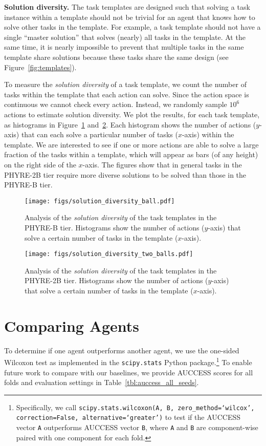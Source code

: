 \documentclass{article}
\begin{document}
\noindent\textbf{Solution diversity.} The task templates are designed such that solving a task instance within a template should not be trivial for an agent that knows how to solve other tasks in the template. For example, a task template should not have a single ``master solution'' that solves (nearly) all tasks in the template. At the same time, it is nearly impossible to prevent that multiple tasks in the same template share solutions because these tasks share the same design (see Figure~\ref{fig:templates}).

To measure the \emph{solution diversity} of a task template, we count the number of tasks within the template that each action can solve. Since the action space is continuous we cannot check every action. Instead, we randomly sample $10^6$ actions to estimate solution diversity. We plot the results, for each task template, as histograms in Figure~\ref{fig:1B-diversity} and~\ref{fig:2B-diversity}. Each histogram shows the number of actions ($y$-axis) that can each solve a particular number of tasks ($x$-axis) within the template. We are interested to see if one or more actions are able to solve a large fraction of the tasks within a template, which will appear as bars (of any height) on the right side of the $x$-axis. The figures show that in general tasks in the PHYRE-2B tier require more diverse solutions to be solved than those in the PHYRE-B tier.

\begin{figure}
\texttt{[image: figs/solution\_diversity\_ball.pdf]}
  \caption{
   Analysis of the \emph{solution diversity} of the task templates in the PHYRE-B tier. Histograms show the number of actions ($y$-axis) that solve a certain number of tasks in the template ($x$-axis).
    }
  \label{fig:1B-diversity}
\end{figure}



\begin{figure}
\texttt{[image: figs/solution\_diversity\_two\_balls.pdf]}
 \caption{
   Analysis of the \emph{solution diversity} of the task templates in the PHYRE-2B tier. Histograms show the number of actions ($y$-axis) that solve a certain number of tasks in the template ($x$-axis).
  }
  \label{fig:2B-diversity}
\end{figure}



\FloatBarrier

\newpage
\section{Comparing Agents}
To determine if one agent outperforms another agent, we use the one-sided Wilcoxon test as implemented in the
\texttt{scipy.stats} Python package.\footnote{Specifically, we call \texttt{scipy.stats.wilcoxon(A, B, zero\_method=`wilcox', correction=False, alternative=`greater')} to test if the AUCCESS vector \texttt{A} outperforms AUCCESS vector \texttt{B}, where \texttt{A} and \texttt{B} are component-wise paired with one component for each fold.} To enable future work to compare with our baselines, we provide AUCCESS scores for all folds and evaluation settings in Table~\ref{tbl:auccess_all_seeds}.
\end{document}

